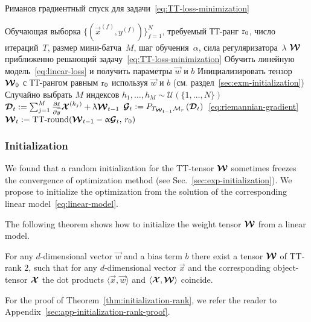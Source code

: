 \begin{algorithm}[t]
   \caption{Риманов градиентный спуск для задачи~\eqref{eq:TT-loss-minimization}}
   \label{alg:rimeannian-optimization}
\begin{algorithmic}
   \REQUIRE Обучающая выборка $\{(\vec{x}^{(f)}, y^{(f)})\}_{f=1}^N$, требуемый ТТ-ранг $\operatorname{r}_0$, число итераций~$T$, размер мини-батча~$M$, шаг обучения~$\alpha$, сила регуляризатора~$\lambda$
   \ENSURE $\boldsymbol{\mathcal{W}}$ приближенно решающий задачу~\eqref{eq:TT-loss-minimization}
   \STATE Обучить линейную модель~\eqref{eq:linear-loss} и получить параметры $\vec{w}$ и $b$
   \STATE Инициализировать тензор $\boldsymbol{\mathcal{W}}_0$ с ТТ-рангом равным $\operatorname{r}_0$ используя $\vec{w}$ и $b$  (см. раздел~\ref{sec:exm-initialization})
        \STATE Случайно выбрать $M$ индексов $h_1, \ldots, h_M \sim \mathcal{U}(\{1, \ldots, N\})$
        \STATE $\boldsymbol{\mathcal{D}}_t := \sum_{j=1}^M \frac{\partial \ell}{\partial \widehat{y}} \boldsymbol{\mathcal{X}}^{(h_j)}  + \uplambda \boldsymbol{\mathcal{W}}_{t-1}$
        \STATE $\boldsymbol{\mathcal{G}}_t := P_{T_{\boldsymbol{\mathcal{W}}_{t-1}} \mathcal{M}_r}\left ( \boldsymbol{\mathcal{D}}_t \right)$~\eqref{eq:riemannian-gradient}
        \STATE $\boldsymbol{\mathcal{W}}_{t} := \operatorname{TT-round}(\boldsymbol{\mathcal{W}}_{t-1} - \upalpha \boldsymbol{\mathcal{G}}_t, \,r_0)$
   \ENDFOR
\end{algorithmic}
\end{algorithm}


\subsubsection{Initialization \label{sec:exm-initialization}}
We found that a random initialization for the TT-tensor $\boldsymbol{\mathcal{W}}$ sometimes freezes the convergence of optimization method (see Sec.~\ref{sec:exp-initialization}).
We propose to initialize the optimization from the solution of the corresponding linear model~\eqref{eq:linear-model}.

The following theorem shows how to initialize the weight tensor $\boldsymbol{\mathcal{W}}$ from a linear model.
\begin{theorem}
\label{thm:initialization-rank}
For any $d$-dimensional vector $\vec{w}$ and a bias term $b$ there exist a tensor $\boldsymbol{\mathcal{W}}$ of TT-rank $2$, such that for any $d$-dimensional vector $\vec{x}$ and the corresponding object-tensor $\boldsymbol{\mathcal{X}}$ the dot products $\langle \vec{x}, \vec{w} \rangle$ and $\langle \boldsymbol{\mathcal{X}}, \boldsymbol{\mathcal{W}} \rangle$ coincide.
\end{theorem}
For the proof of Theorem~\ref{thm:initialization-rank}, we refer the reader to Appendix~\ref{sec:app-initialization-rank-proof}.

